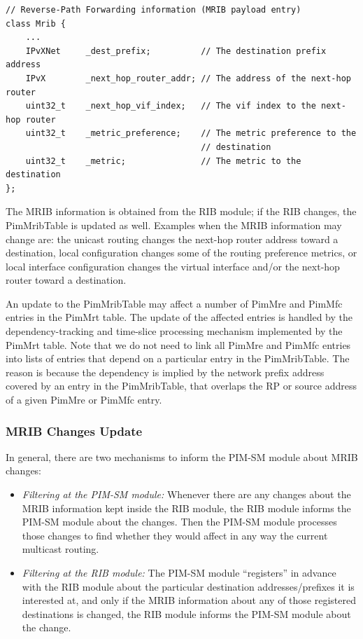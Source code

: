 \documentclass[11pt]{article}
\begin{document}
{\small
\begin{verbatim}
// Reverse-Path Forwarding information (MRIB payload entry)
class Mrib {
    ...
    IPvXNet     _dest_prefix;          // The destination prefix address
    IPvX        _next_hop_router_addr; // The address of the next-hop router
    uint32_t    _next_hop_vif_index;   // The vif index to the next-hop router
    uint32_t    _metric_preference;    // The metric preference to the
                                       // destination
    uint32_t    _metric;               // The metric to the destination
};
\end{verbatim}
} %


The MRIB information is obtained from the RIB
module; if the RIB changes, the
PimMribTable is updated as well. Examples when the MRIB information
may change are: the unicast routing changes the next-hop router address
toward a destination, local configuration changes some of the routing
preference metrics, or local interface configuration changes the virtual
interface and/or the next-hop router toward a destination.

An update to the PimMribTable may affect a number of PimMre and PimMfc
entries in the PimMrt table. The update of the affected entries is
handled by the dependency-tracking and time-slice processing mechanism
implemented by the PimMrt table. Note that we do not need to link all
PimMre and PimMfc entries into lists of entries that depend on a
particular entry in the PimMribTable. The reason is because the
dependency is implied by the network prefix address covered by an entry
in the PimMribTable, that overlaps the RP or source address of a given
PimMre or PimMfc entry.

\subsubsection{MRIB Changes Update}

In general, there are two mechanisms to inform the PIM-SM module about
MRIB changes:

\begin{itemize}
  \item \emph{Filtering at the PIM-SM module:}
  Whenever there are any changes about the MRIB information kept inside
  the RIB module, the RIB module informs the PIM-SM module
  about the changes. Then the PIM-SM module processes those changes to
  find whether they would affect in any way the current multicast
  routing.

  \item \emph{Filtering at the RIB module:}
  The PIM-SM module ``registers'' in advance with the RIB module about
  the particular destination addresses/prefixes it is interested at, and
  only if the MRIB information about any of those registered destinations
  is changed, the RIB module informs the PIM-SM module about the change.

\end{itemize}
\end{document}
